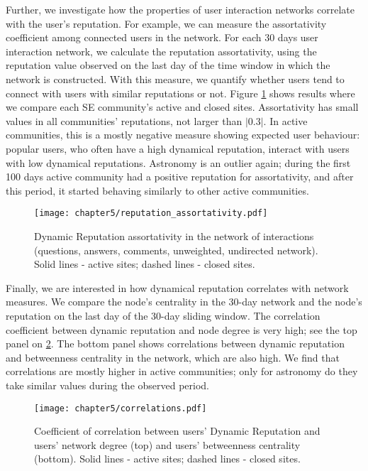 Further, we investigate how the properties of user interaction networks correlate with the user’s reputation. For example, we can measure the assortativity coefficient among connected users in the network. For each 30 days user interaction network, we calculate the reputation assortativity, using the reputation value observed on the last day of the time window in which the network is constructed. With this measure, we quantify whether users tend to connect with users with similar reputations or not. Figure \ref{fig:dyn_rep_assort} shows results where we compare each SE community’s active and closed sites. Assortativity has small values in all communities’ reputations, not larger than $|0.3|$. In active communities, this is a mostly negative measure showing expected user behaviour: popular users, who often have a high dynamical reputation, interact with users with low dynamical reputations. Astronomy is an outlier again; during the first 100 days active community had a positive reputation for assortativity, and after this period, it started behaving similarly to other active communities. 

\begin{figure}[h]
	\centering
	\texttt{[image: chapter5/reputation\_assortativity.pdf]}
	\caption[Dynamic Reputation assortativity]{Dynamic Reputation assortativity in the network of interactions (questions, answers, comments, unweighted, undirected network). Solid lines - active sites; dashed lines - closed sites.}
	\label{fig:dyn_rep_assort}
\end{figure}

Finally, we are interested in how dynamical reputation correlates with network measures. We compare the node’s centrality in the 30-day network and the node’s reputation on the last day of the 30-day sliding window. The correlation coefficient between dynamic reputation and node degree is very high; see the top panel on \ref{fig:dyn_rep_centrality}. The bottom panel shows correlations between dynamic reputation and betweenness centrality in the network, which are also high. We find that correlations are mostly higher in active communities; only for astronomy do they take similar values during the observed period. 

\begin{figure}[h]
	\centering
	\texttt{[image: chapter5/correlations.pdf]}
	\caption[Coefficient correlation between ]{Coefficient of correlation between users’ Dynamic Reputation and users’ network degree (top) and users’ betweenness centrality (bottom). Solid lines - active sites; dashed lines - closed sites.}
	\label{fig:dyn_rep_centrality}
\end{figure}

